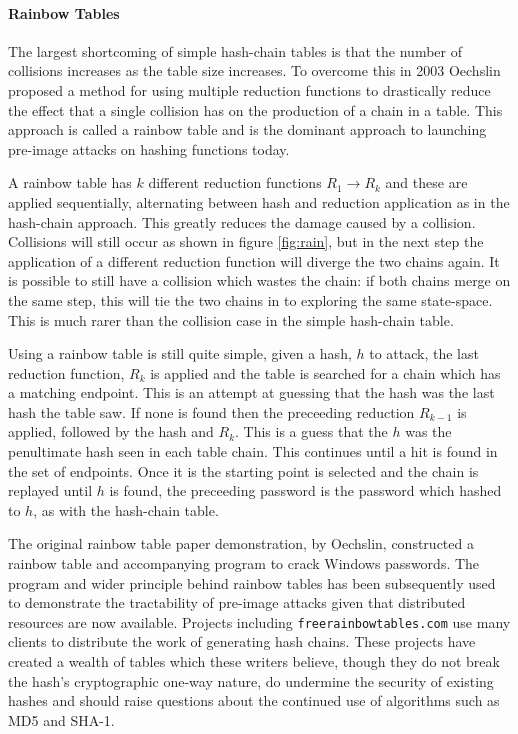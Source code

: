 \documentclass[a4paper,12pt]{article}
\begin{document}
\paragraph{Rainbow Tables}
The largest shortcoming of simple hash-chain tables is that the number of collisions increases as the table size increases. To overcome this in 2003 Oechslin\cite{Oechslin} proposed a method for using multiple reduction functions to drastically reduce the effect that a single collision has on the production of a chain in a table. This approach is called a rainbow table and is the dominant approach to launching pre-image attacks on hashing functions today.

A rainbow table has $k$ different reduction functions $R_1 \rightarrow R_k$ and these are applied sequentially, alternating between hash and reduction application as in the hash-chain approach. This greatly reduces the damage caused by a collision. Collisions will still occur as shown in figure \ref{fig:rain}, but in the next step the application of a different reduction function will diverge the two chains again. It is possible to still have a collision which wastes the chain: if both chains merge on the same step, this will tie the two chains in to exploring the same state-space. This is much rarer than the collision case in the simple hash-chain table.

Using a rainbow table is still quite simple, given a hash, $h$ to attack, the last reduction function, $R_k$ is applied and the table is searched for a chain which has a matching endpoint. This is an attempt at guessing that the hash was the last hash the table saw.
If none is found then the preceeding reduction $R_{k-1}$ is applied, followed by the hash and $R_k$. This is a guess that the $h$ was the penultimate hash seen in each table chain. This continues until a hit is found in the set of endpoints. Once it is the starting point is selected and the chain is replayed until $h$ is found, the preceeding password is the password which hashed to $h$, as with the hash-chain table.


The original rainbow table paper demonstration, by Oechslin, constructed a rainbow table and accompanying program to crack Windows passwords. The program and wider principle behind rainbow tables has been subsequently used to demonstrate the tractability of pre-image attacks given that distributed resources are now available. Projects including \texttt{freerainbowtables.com} use many clients to distribute the work of generating hash chains. These projects have created a wealth of tables which these writers believe, though they do not break the hash's cryptographic one-way nature, do undermine the security of existing hashes and should raise questions about the continued use of algorithms such as MD5 and SHA-1.
\end{document}
